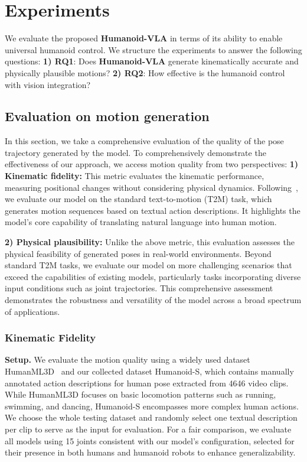 \section{Experiments}
We evaluate the proposed \textbf{Humanoid-VLA} in terms of its ability to enable universal humanoid control.
We structure the experiments to answer
the following questions:
\textbf{1) RQ1}: Does \textbf{Humanoid-VLA} generate kinematically accurate and physically plausible motions?
\textbf{2) RQ2}: How effective is the humanoid control with vision integration?

\subsection{Evaluation on motion generation}
In this section, we take a comprehensive evaluation of the quality of the pose trajectory generated by the model.
To comprehensively demonstrate the effectiveness of our approach, we access motion quality from two perspectives:
\textbf{1) Kinematic fidelity:}
This metric evaluates the kinematic performance, measuring positional changes without considering physical dynamics.
Following~\cite{mao2024learning}, we evaluate our model on the standard text-to-motion (T2M) task, which generates motion sequences based on textual action descriptions. It highlights the model's core capability of translating natural language into human motion.  

\textbf{2) Physical plausibility:}
Unlike the above metric, this evaluation assesses the physical feasibility of generated poses in real-world environments.
Beyond standard T2M tasks, we evaluate our model on more challenging scenarios that exceed the capabilities of existing models, particularly tasks incorporating diverse input conditions such as joint trajectories. This comprehensive assessment demonstrates the robustness and versatility of the model across a broad spectrum of applications.

\vspace{-4pt}
\subsubsection{Kinematic Fidelity }
\vspace{-4pt}
\textbf{Setup.} 
We evaluate the motion quality using a widely used dataset HumanML3D~\cite{guo2022humanml3d} and our collected dataset Humanoid-S, which contains manually annotated action descriptions for human pose extracted from 4646 video clips.
%
While HumanML3D focuses on basic locomotion patterns such as running, swimming, and dancing, Humanoid-S encompasses more complex human actions.
%
We choose the whole testing dataset and randomly select one textual description per clip to serve as the input for evaluation. 
%
For a fair comparison, we evaluate all models using 15 joints consistent with our model's configuration, selected for their presence in both humans and humanoid robots to enhance generalizability.

